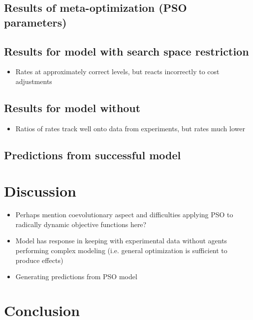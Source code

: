 \documentclass[12pt,a4paper]{article}
\begin{document}
\subsection{Results of meta-optimization (PSO parameters)}
\subsection{Results for model with search space restriction}
\begin{itemize}
\item Rates at approximately correct levels, but reacts incorrectly to cost adjustments
\end{itemize}
\subsection{Results for model without}
\begin{itemize}
\item Ratios of rates track well onto data from experiments, but rates much lower
\end{itemize}
\subsection{Predictions from successful model}

\section{Discussion}
\begin{itemize}
\item Perhaps mention coevolutionary aspect and difficulties applying PSO to radically dynamic objective functions here?

\item Model has response in keeping with experimental data without agents performing complex modeling (i.e. general optimization is sufficient to produce effects)

\item Generating predictions from PSO model
\end{itemize}
\section{Conclusion}





\end{document}

